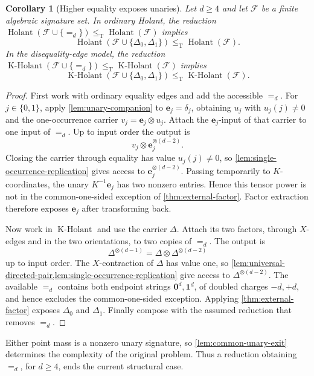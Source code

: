 \documentclass[11pt,letterpaper,onecolumn]{article}
\theoremstyle{plain}
\newtheorem{corollary}[corollary]{Corollary}
\theoremstyle{definition}
\theoremstyle{remark}
\newcommand{\cF}{\mathcal F}
\newcommand{\Holant}{\operatorname{Holant}}
\newcommand{\KHolant}{\operatorname{K\text{-}Holant}}
\newcommand{\Eq}{=}
\newcommand{\one}{\mathbf 1}
\newcommand{\zero}{\mathbf 0}
\newcommand{\DeltaZero}{\Delta_0}
\newcommand{\DeltaOne}{\Delta_1}
\newcommand{\leT}{\leq_{\mathrm T}}
\begin{document}
\begin{corollary}[Higher equality exposes unaries]
\label{cor:higher-equality-unary}
Let \(d\ge4\) and let \(\cF\) be a finite algebraic signature set.
In ordinary Holant, the reduction
\(\Holant(\cF\cup\{\Eq_d\})\leT\Holant(\cF)\) implies
\[
 \Holant(\cF\cup\{\DeltaZero,\DeltaOne\})\leT\Holant(\cF).
\]
In the disequality-edge model, the reduction
\(\KHolant(\cF\cup\{\Eq_d\})\leT\KHolant(\cF)\) implies
\[
 \KHolant(\cF\cup\{\DeltaZero,\DeltaOne\})\leT\KHolant(\cF).
\]
\end{corollary}

\begin{proof}
First work with ordinary equality edges and add the accessible \(\Eq_d\).
For \(j\in\{0,1\}\), apply \cref{lem:unary-companion} to
\({\mathbf{e}}_j=\delta_j\), obtaining \(u_j\) with \(u_j(j)\ne0\) and the
one-occurrence carrier \(v_j={\mathbf{e}}_j\otimes u_j\).  Attach the \({\mathbf{e}}_j\)-input of
that carrier to one input of \(\Eq_d\).  Up to input order the output is
\[
  v_j\otimes {\mathbf{e}}_j^{\otimes(d-2)}.
\]
Closing the carrier through equality has value \(u_j(j)\ne0\), so
\cref{lem:single-occurrence-replication} gives access to
\({\mathbf{e}}_j^{\otimes(d-2)}\).  Passing temporarily to \(K\)-coordinates, the unary
\(K^{-1}{\mathbf{e}}_j\) has two nonzero entries. Hence this tensor power is not in the
common-one-sided exception of \cref{thm:external-factor}.  Factor extraction
therefore exposes \({\mathbf{e}}_j\) after transforming back.

Now work in \(\KHolant\) and use the carrier \(\Delta\).  Attach its two factors,
through \(X\)-edges and in the two orientations, to two copies of
\(\Eq_d\).  The output is
\[
  \Delta^{\otimes(d-1)}
  =\Delta\otimes\Delta^{\otimes(d-2)}
\]
up to input order.  The \(X\)-contraction of \(\Delta\) has value one, so
\cref{lem:universal-directed-pair,lem:single-occurrence-replication} give
access to \(\Delta^{\otimes(d-2)}\).  The available \(\Eq_d\) contains both
endpoint strings \(\zero^d,\one^d\), of doubled charges \(-d,+d\), and hence
excludes the common-one-sided exception. Applying
\cref{thm:external-factor} exposes \(\DeltaZero\) and \(\DeltaOne\).  Finally
compose with the assumed reduction that removes \(\Eq_d\).
\end{proof}

Either point mass is a nonzero unary signature, so
\cref{lem:common-unary-exit} determines the complexity of the original
problem. Thus a reduction obtaining \(\Eq_d\), for \(d\ge4\), ends the
current structural case.
\end{document}
